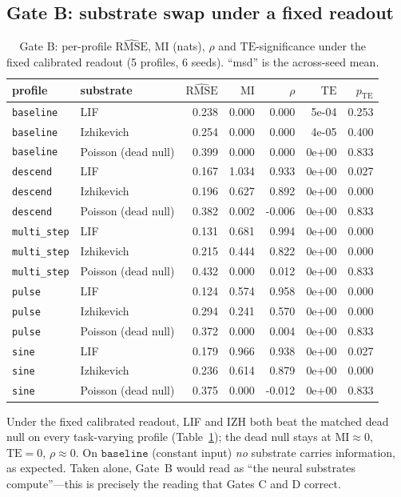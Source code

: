 \documentclass[12pt]{article}
\begin{document}
\subsection{Gate B: substrate swap under a fixed readout}\label{sec:gateb}
\begin{table}[H]
\centering
\caption{Gate B: per-profile $\widehat{\mathrm{RMSE}}$, $\mathrm{MI}$ (nats), $\rho$
and $\mathrm{TE}$-significance under the fixed calibrated readout (5 profiles,
6 seeds). ``msd'' is the across-seed mean.}
\label{tab:gateb}
\begin{tabular}{llrrrrr}
\toprule
profile & substrate & $\widehat{\mathrm{RMSE}}$ & $\mathrm{MI}$ & $\rho$ & $\mathrm{TE}$ & $p_{\mathrm{TE}}$ \\
\midrule
\texttt{baseline} & LIF & 0.238 & 0.000 & 0.000 & 5e-04 & 0.253 \\
\texttt{baseline} & Izhikevich & 0.254 & 0.000 & 0.000 & 4e-05 & 0.400 \\
\texttt{baseline} & Poisson (dead null) & 0.399 & 0.000 & 0.000 & 0e+00 & 0.833 \\
\texttt{descend} & LIF & 0.167 & 1.034 & 0.933 & 0e+00 & 0.027 \\
\texttt{descend} & Izhikevich & 0.196 & 0.627 & 0.892 & 0e+00 & 0.000 \\
\texttt{descend} & Poisson (dead null) & 0.382 & 0.002 & -0.006 & 0e+00 & 0.833 \\
\texttt{multi\_step} & LIF & 0.131 & 0.681 & 0.994 & 0e+00 & 0.000 \\
\texttt{multi\_step} & Izhikevich & 0.215 & 0.444 & 0.822 & 0e+00 & 0.000 \\
\texttt{multi\_step} & Poisson (dead null) & 0.432 & 0.000 & 0.012 & 0e+00 & 0.833 \\
\texttt{pulse} & LIF & 0.124 & 0.574 & 0.958 & 0e+00 & 0.000 \\
\texttt{pulse} & Izhikevich & 0.294 & 0.241 & 0.570 & 0e+00 & 0.000 \\
\texttt{pulse} & Poisson (dead null) & 0.372 & 0.000 & 0.004 & 0e+00 & 0.833 \\
\texttt{sine} & LIF & 0.179 & 0.966 & 0.938 & 0e+00 & 0.027 \\
\texttt{sine} & Izhikevich & 0.236 & 0.614 & 0.879 & 0e+00 & 0.000 \\
\texttt{sine} & Poisson (dead null) & 0.375 & 0.000 & -0.012 & 0e+00 & 0.833 \\
\bottomrule
\end{tabular}
\end{table}
Under the fixed calibrated readout, LIF and IZH both beat the matched
dead null on every task-varying profile (Table~\ref{tab:gateb});
the dead null stays at $\mathrm{MI}\approx0$, $\mathrm{TE}=0$, $\rho\approx0$. On
$\mathtt{baseline}$ (constant input) \emph{no} substrate carries
information, as expected. Taken alone, Gate~B would read as ``the
neural substrates compute''---this is precisely the reading that Gates
C and D correct.
\end{document}
